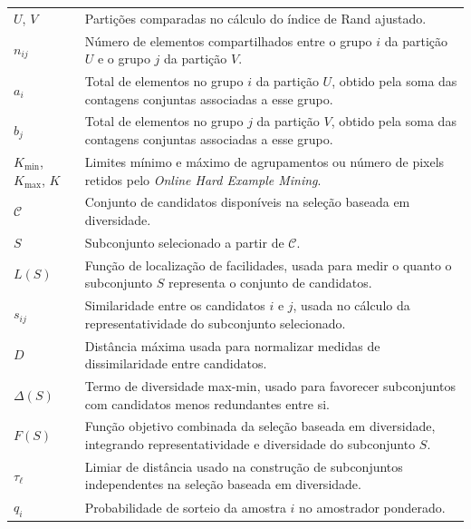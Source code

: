 \begin{longtable}{p{3.0cm}p{12.0cm}}
  $U$, $V$ &
  Partições comparadas no cálculo do índice de Rand ajustado.\\

  $n_{ij}$ &
  Número de elementos compartilhados entre o grupo $i$ da partição $U$ e o grupo
  $j$ da partição $V$.\\

  $a_i$ &
  Total de elementos no grupo $i$ da partição $U$, obtido pela soma das contagens
  conjuntas associadas a esse grupo.\\

  $b_j$ &
  Total de elementos no grupo $j$ da partição $V$, obtido pela soma das contagens
  conjuntas associadas a esse grupo.\\

  $K_{\min}$, $K_{\max}$, $K$ &
  Limites mínimo e máximo de agrupamentos ou número de pixels retidos pelo
  \textit{Online Hard Example Mining}.\\

  $\mathcal{C}$ &
  Conjunto de candidatos disponíveis na seleção baseada em diversidade.\\

  $S$ &
  Subconjunto selecionado a partir de $\mathcal{C}$.\\

  $L(S)$ &
  Função de localização de facilidades, usada para medir o quanto o subconjunto
  $S$ representa o conjunto de candidatos.\\

  $s_{ij}$ &
  Similaridade entre os candidatos $i$ e $j$, usada no cálculo da
  representatividade do subconjunto selecionado.\\

  $D$ &
  Distância máxima usada para normalizar medidas de dissimilaridade entre
  candidatos.\\

  $\Delta(S)$ &
  Termo de diversidade max-min, usado para favorecer subconjuntos com candidatos
  menos redundantes entre si.\\

  $F(S)$ &
  Função objetivo combinada da seleção baseada em diversidade, integrando
  representatividade e diversidade do subconjunto $S$.\\

  $\tau_\ell$ &
  Limiar de distância usado na construção de subconjuntos independentes na
  seleção baseada em diversidade.\\

  $q_i$ &
  Probabilidade de sorteio da amostra $i$ no amostrador ponderado.\\


\end{longtable}
